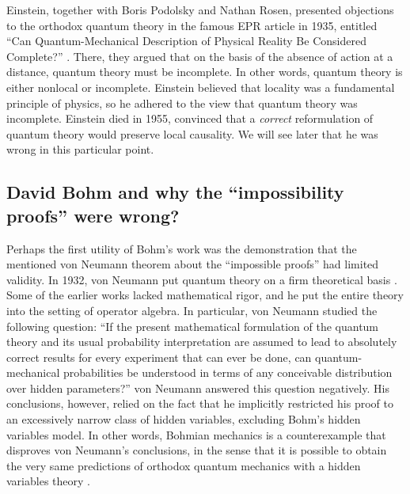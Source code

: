 \documentclass[nofootinbib, secnumarabic, amsmath, nobibnotes,10pt,aps,pra]{revtex4-1}
\begin{document}
Einstein, together with Boris Podolsky and Nathan Rosen, presented
objections to the orthodox quantum theory in the famous EPR article in 1935,
entitled ``Can Quantum-Mechanical Description of Physical Reality Be
Considered Complete?'' \cite{om.Einstein_rosen1935}. There, they
argued that on the basis of the absence of action at a distance,
quantum theory must be incomplete. In other words, quantum theory is
either nonlocal or incomplete. Einstein believed that locality was a
fundamental principle of physics, so he adhered to the view that
quantum theory was incomplete. Einstein died in 1955, convinced that
a \textit{correct} reformulation of quantum theory would preserve
local causality. We will see later that he was wrong in this particular point.  


\subsection{David Bohm and why the ``impossibility proofs'' were wrong?}\label{om.sec_intro.7}

Perhaps the first utility of Bohm's work was the demonstration that the mentioned von Neumann theorem about the ``impossible proofs'' had limited validity. In 1932, von Neumann put quantum theory on a firm theoretical basis \cite{om.impossibility_proofs}. Some of the earlier works lacked mathematical rigor, and he put the entire theory into the setting of operator algebra. In particular,  von Neumann studied the following question: ``If the present mathematical formulation of the quantum theory and its usual probability interpretation are assumed to lead to absolutely correct results for every experiment that can ever be done, can quantum-mechanical probabilities be understood in terms of any conceivable distribution over hidden parameters?'' von Neumann answered this question negatively.
His conclusions, however, relied on the fact that he implicitly restricted his proof to an excessively narrow class of hidden variables, excluding Bohm's hidden variables model.
In other words, Bohmian mechanics is a counterexample that disproves von Neumann's conclusions, in the sense that it is possible to obtain the very same predictions of orthodox quantum mechanics with a hidden variables theory \cite{om.Holand1993,om.Bell1987}.
\end{document}
